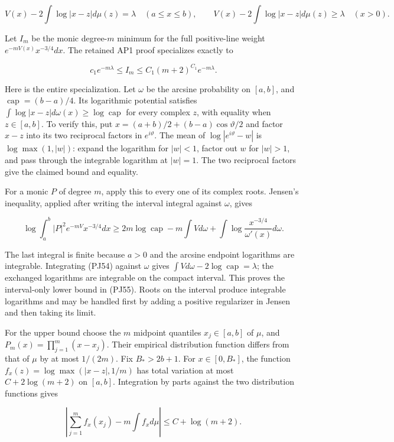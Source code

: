 \documentclass[10pt]{article}
\begin{document}
\[
V(x)-2\int\log|x-z|d\mu(z)=\lambda\quad(a\le x\le b),
\qquad
V(x)-2\int\log|x-z|d\mu(z)\ge\lambda\quad(x>0).
\tag{PJ54}
\]

Let \(I_m\) be the monic degree-\(m\) minimum for the full positive-line weight \(e^{-mV(x)}x^{-3/4}dx\). The retained AP1 proof specializes exactly to

\[
c_1e^{-m\lambda}\le I_m\le C_1(m+2)^{C_1}e^{-m\lambda}.
\tag{PJ55}
\]

Here is the entire specialization. Let \(\omega\) be the arcsine probability on \([a,b]\), and \(\operatorname{cap}=(b-a)/4\). Its logarithmic potential satisfies \(\int\log|x-z|d\omega(x)\ge\log\operatorname{cap}\) for every complex \(z\), with equality when \(z\in[a,b]\). To verify this, put \(x=(a+b)/2+(b-a)\cos\vartheta/2\) and factor \(x-z\) into its two reciprocal factors in \(e^{i\vartheta}\). The mean of \(\log|e^{i\vartheta}-w|\) is \(\log\max(1,|w|)\): expand the logarithm for \(|w|<1\), factor out \(w\) for \(|w|>1\), and pass through the integrable logarithm at \(|w|=1\). The two reciprocal factors give the claimed bound and equality.

For a monic \(P\) of degree \(m\), apply this to every one of its complex roots. Jensen's inequality, applied after writing the interval integral against \(\omega\), gives

\[
\log\int_a^b|P|^2e^{-mV}x^{-3/4}dx
\ge2m\log\operatorname{cap}-m\int Vd\omega
+\int\log\frac{x^{-3/4}}{\omega'(x)}d\omega.
\]

The last integral is finite because \(a>0\) and the arcsine endpoint logarithms are integrable. Integrating (PJ54) against \(\omega\) gives \(\int Vd\omega-2\log\operatorname{cap}=\lambda\); the exchanged logarithms are integrable on the compact interval. This proves the interval-only lower bound in (PJ55). Roots on the interval produce integrable logarithms and may be handled first by adding a positive regularizer in Jensen and then taking its limit.

For the upper bound choose the \(m\) midpoint quantiles \(x_j\in[a,b]\) of \(\mu\), and \(P_m(x)=\prod_{j=1}^m(x-x_j)\). Their empirical distribution function differs from that of \(\mu\) by at most \(1/(2m)\). Fix \(B_*>2b+1\). For \(x\in[0,B_*]\), the function \(f_x(z)=\log\max(|x-z|,1/m)\) has total variation at most \(C+2\log(m+2)\) on \([a,b]\). Integration by parts against the two distribution functions gives

\[
\left|\sum_{j=1}^mf_x(x_j)-m\int f_xd\mu\right|
\le C+\log(m+2).
\]
\end{document}
